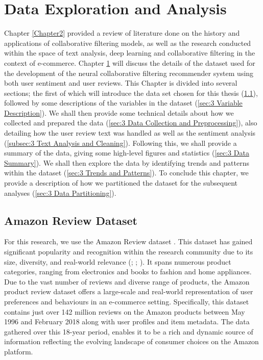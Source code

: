 \chapter{Data Exploration and Analysis} %

\label{Chapter3} %

Chapter \ref{Chapter2} provided a review of literature done on the history and applications of collaborative filtering models, as well as the research conducted within the space of text analysis, deep learning and collaborative filtering in the context of e-commerce. Chapter \ref{Chapter3} will discuss the details of the dataset used for the development of the neural collaborative filtering recommender system using both user sentiment and user reviews. This Chapter is divided into several sections; the first of which will introduce the data set chosen for this thesis (\ref{subsec:3 Amazon Review Dataset}), followed by some descriptions of the variables in the dataset (\ref{sec:3 Variable Description}). We shall then provide some technical details about how we collected and prepared the data (\ref{sec:3 Data Collection and Preprocessing}), also detailing how the user review text was handled as well as the sentiment analysis (\ref{subsec:3 Text Analysis and Cleaning}). Following this, we shall provide a summary of the data, giving some high-level figures and statistics (\ref{sec:3 Data Summary}). We shall then explore the data by identifying trends and patterns within the dataset (\ref{sec:3 Trends and Patterns}). To conclude this chapter, we provide a description of how we partitioned the dataset for the subsequent analyses (\ref{sec:3 Data Partitioning}). 

\section{Amazon Review Dataset}
\label{subsec:3 Amazon Review Dataset}

For this research, we use the Amazon Review dataset \cite{mcauley2013hidden}. This dataset has gained significant popularity and recognition within the research community due to its size, diversity, and real-world relevance (\cite{kaushik2018exploring}; \cite{haque2018sentiment}; \cite{skalicky2015statistical}). It spans numerous product categories, ranging from electronics and books to fashion and home appliances. Due to the vast number of reviews and diverse range of products, the Amazon product review dataset offers a large-scale and real-world representation of user preferences and behaviours in an e-commerce setting. Specifically, this dataset contains just over 142 million reviews on the Amazon products between May 1996 and February 2018 along with user profiles and item metadata. The data gathered over this 18-year period, enables it to be a rich and dynamic source of information reflecting the evolving landscape of consumer choices on the Amazon platform.

